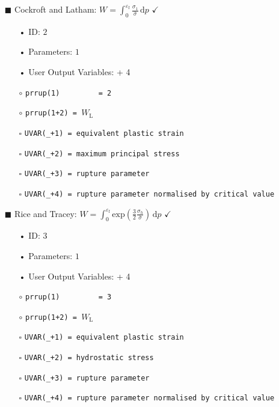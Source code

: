 \documentclass[11pt,a4paper,twoside,final,onecolumn,titlepage]{article}
\newcommand{\verified}{\hspace{0.5pt} {\LARGE $\checkmark$}}
\begin{document}
\begin{itemize}
	\item[\tiny$\blacksquare$] Cockroft and Latham: $\displaystyle W =  \int_{0}^{\varepsilon_\textrm{f}}\frac{\sigma_{1}}{\bar{\sigma}}\,\text{d}p$ \verified{}
	\begin{itemize}
		\item[•] ID: $2$
		\item[•] Parameters: $1$
		\item[•] User Output Variables: + 4\\
		\item[$\circ$] \texttt{prrup(1)\,\,\,\,\,\,\,\,\,= 2}
		\item[$\circ$] \texttt{prrup(1+2) = $W_\textrm{L}$}\\
		\item[\tiny$\square$] \texttt{UVAR(\_+1) = equivalent plastic strain}
		\item[\tiny$\square$] \texttt{UVAR(\_+2) = maximum principal stress}
		\item[\tiny$\square$] \texttt{UVAR(\_+3) = rupture parameter}
		\item[\tiny$\square$] \texttt{UVAR(\_+4) = rupture parameter normalised by critical value}\\
	\end{itemize}
\end{itemize}

\begin{itemize}
	\item[\tiny$\blacksquare$] Rice and Tracey: $\displaystyle W = \int_{0}^{\varepsilon_\textrm{f}} \text{exp}\left(\frac{3}{2}\frac{\sigma_h}{\bar{\sigma}}\right)\,\text{d}p$ \verified{}
	\begin{itemize}
		\item[•] ID: $3$
		\item[•] Parameters: $1$
		\item[•] User Output Variables: + 4\\
		\item[$\circ$] \texttt{prrup(1)\,\,\,\,\,\,\,\,\,= 3}
		\item[$\circ$] \texttt{prrup(1+2) = $W_\textrm{L}$}\\
		\item[\tiny$\square$] \texttt{UVAR(\_+1) = equivalent plastic strain}
		\item[\tiny$\square$] \texttt{UVAR(\_+2) = hydrostatic stress}
		\item[\tiny$\square$] \texttt{UVAR(\_+3) = rupture parameter}
		\item[\tiny$\square$] \texttt{UVAR(\_+4) = rupture parameter normalised by critical value}\\
	\end{itemize}
\end{itemize}
\end{document}
